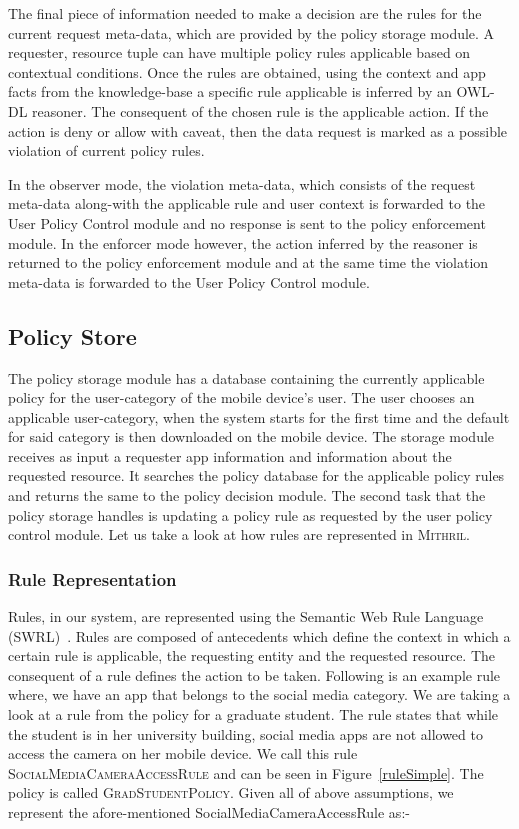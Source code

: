 The final piece of information needed to make a decision are the rules for the current request meta-data, which are provided by the policy storage module. A requester, resource tuple can have multiple policy rules applicable based on contextual conditions. Once the rules are obtained, using the context and app facts from the knowledge-base a specific rule applicable is inferred by an OWL-DL reasoner. The consequent of the chosen rule is the applicable action. If the action is deny or allow with caveat, then the data request is marked as a possible violation of current policy rules. 

In the observer mode, the violation meta-data, which consists of the request meta-data along-with the applicable rule and user context is forwarded to the User Policy Control module and no response is sent to the policy enforcement module. In the enforcer mode however, the action inferred by the reasoner is returned to the policy enforcement module and at the same time the violation meta-data is forwarded to the User Policy Control module.

\subsection{Policy Store}
\label{polsto}
The policy storage module has a database containing the currently applicable policy for the user-category of the mobile device's user. The user chooses an applicable user-category, when the system starts for the first time and the default for said category is then downloaded on the mobile device. The storage module receives as input a requester app information and information about the requested resource. It searches the policy database for the applicable policy rules and returns the same to the policy decision module. The second task that the policy storage handles is updating a policy rule as requested by the user policy control module. Let us take a look at how rules are represented in \textsc{Mithril}. 

\subsubsection{Rule Representation}
\label{ruleRepresentation}
Rules, in our system, are represented using the Semantic Web Rule Language (SWRL)~\cite{horrocks2004swrl}. Rules are composed of antecedents which define the context in which a certain rule is applicable, the requesting entity and the requested resource. The consequent of a rule defines the action to be taken. Following is an example rule where, we have an app that belongs to the social media category. We are taking a look at a rule from the policy for a graduate student. The rule states that while the student is in her university building, social media apps are not allowed to access the camera on her mobile device. We call this rule \textsc{SocialMediaCameraAccessRule} and can be seen in Figure~\ref{ruleSimple}. The policy is called \textsc{GradStudentPolicy}. Given all of above assumptions, we represent the afore-mentioned SocialMediaCameraAccessRule as:-

